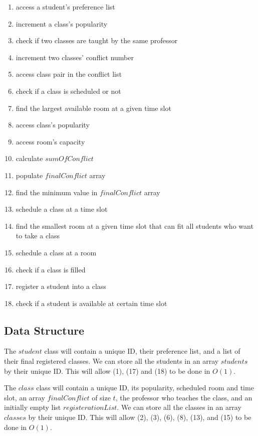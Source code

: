 \documentclass[11pt, oneside]{article}   	%
\begin{document}
\begin{enumerate}
    \item access a student's preference list
    \item increment a class's popularity
    \item check if two classes are taught by the same professor
    \item increment two classes' conflict number 
    \item access class pair in the conflict list
    \item check if a class is scheduled or not
    \item find the largest available room at a given time slot
    \item access class's popularity
    \item access room's capacity
    \item calculate $sumOfConflict$
    \item populate $finalConflict$ array
    \item find the minimum value in $finalConflict$ array
    \item schedule a class at a time slot
    \item find the smallest room at a given time slot that can fit all students who want to take a class
    \item schedule a class at a room 
    \item check if a class is filled 
    \item register a student into a class
    \item check if a student is available at certain time slot
\end{enumerate}


\subsection{Data Structure}
The $student$ class will contain a unique ID, their preference list, and a list of their final registered classes. We can store all the students in an array $students$ by their unique ID. This will allow (1), (17) and (18) to be done in $O(1)$.

The $class$ class will contain a unique ID, its popularity, scheduled room and time slot, an array $finalConflict$ of size $t$, the professor who teaches the class, and an initially empty list $registerationList$. We can store all the classes in an array $classes$ by their unique ID. This will allow (2), (3), (6), (8), (13), and (15) to be done in $O(1)$. 
\end{document}
